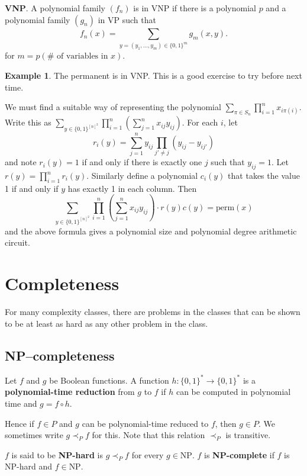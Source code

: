 \documentclass{article}
\theoremstyle{definition}
\newtheorem{example}{Example}[section]
\begin{document}
\textbf{VNP}. A polynomial family $(f_n)$ is in VNP if there is a polynomial $p$ and a polynomial family $(g_n)$ in VP such that \[
f_n(x) = \sum_{y = (y_1,\ldots,y_m) \in \{0,1\}^m}^{} g_m(x,y). 
\]
for $m = p(\# \text{ of variables in }x)$.
\vspace{1mm}
 
\begin{example}
    The permanent is in VNP. This is a good exercise to try before next time.
    \vspace{1mm}
     
    We must find a suitable way of representing the polynomial $\sum_{\pi \in S_n}^{} \prod_{i=1}^{n} x_{i \pi(i)}$. Write this as $\sum_{y \in \{0,1\}^{[n]^2}}^{} \prod_{i=1}^{n} (\sum_{j=1}^{n} x_{ij}y_{ij})$. For each $i$, let $$r_i(y) = \sum_{j=1}^{n} y_{ij}\prod_{j' \neq j}^{} (y_{ij}-y_{ij'})$$
    and note $r_i(y)=1$ if and only if there is exactly one $j$ such that $y_{ij} = 1$. Let $r(y) = \prod_{i=1}^{n} r_i(y)$. Similarly define a polynomial $c_i(y)$ that takes the value 1 if and only if $y$ has exactly 1 in each column. Then \[
        \sum_{y \in \{0,1\}^{[n]^2}}^{} \prod_{i=1}^{n} (\sum_{j=1}^{n} x_{ij}y_{ij}) \cdot r(y)c(y) = \text{perm}(x)
    \]
    and the above formula gives a polynomial size and polynomial degree arithmetic circuit.
\end{example}

\section{Completeness}
For many complexity classes, there are problems in the classes that can be shown to be at least as hard as any other problem in the class.

\subsection{NP--completeness}
Let $f$ and $g$ be Boolean functions. A function $h : \{0,1\}^* \to \{0,1\}^*$ is a \textbf{polynomial-time reduction} from $g$ to $f$ if $h$ can be computed in polynomial time and $g = f \circ h$.
\vspace{1mm}
 
Hence if $f \in P$ and $g$ can be polynomial-time reduced to $f$, then $g \in P$. We sometimes write $g \prec_P f$ for this. Note that this relation $\prec_P$ is transitive.
\vspace{1mm}
 
$f$ is said to be \textbf{NP-hard} is $g \prec_P f$ for every $g \in \text{NP}$. $f$ is \textbf{NP-complete} if $f$ is NP-hard and $f \in \text{NP}$.
\end{document}
